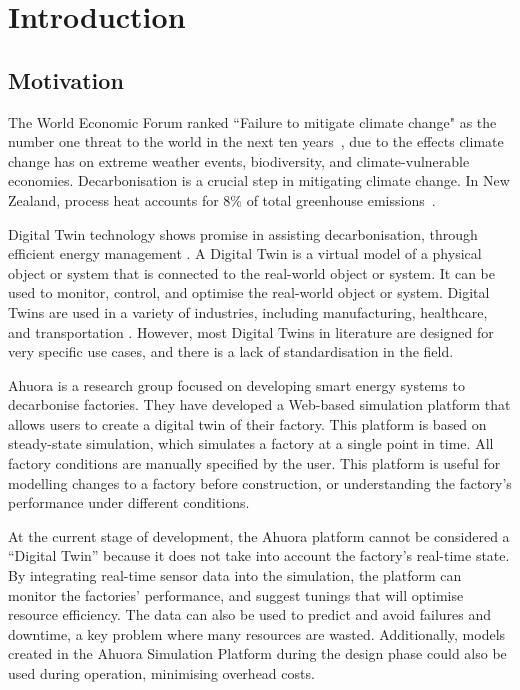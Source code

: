 \chapter{Introduction}



\section{Motivation}

The World Economic Forum ranked ``Failure to mitigate climate change" as the number one threat to the world in the next ten years~\cite{GlobalRisksReport}, due to the effects climate change has on extreme weather events, biodiversity, and climate-vulnerable economies. Decarbonisation is a crucial step in mitigating climate change. In New Zealand, process heat accounts for 8\% of total greenhouse emissions~\cite{DecarbonisingProcessHeat}.

Digital Twin technology shows promise in assisting decarbonisation, through efficient energy management \cite{yu2022energy}. A Digital Twin is a virtual model of a physical object or system that is connected to the real-world object or system. It can be used to monitor, control, and optimise the real-world object or system. Digital Twins are used in a variety of industries, including manufacturing, healthcare, and transportation \cite{9359733}. However, most Digital Twins in literature are designed for very specific use cases, and there is a lack of standardisation in the field.

Ahuora is a research group focused on developing smart energy systems to decarbonise factories. They have developed a Web-based simulation platform that allows users to create a digital twin of their factory.
This platform is based on steady-state simulation, which simulates a factory at a single point in time. All factory conditions are manually specified by the user.
This platform is useful for modelling changes to a factory before construction, or understanding the factory's performance under different conditions.

At the current stage of development, the Ahuora platform cannot be considered a ``Digital Twin'' because it does not take into account the factory's real-time state.
By integrating real-time sensor data into the simulation, the platform can monitor the factories' performance, and suggest tunings that will optimise resource efficiency.
The data can also be used to predict and avoid failures and downtime, a key problem where many resources are wasted.
Additionally, models created in the Ahuora Simulation Platform during the design phase could also be used during operation, minimising overhead costs.

